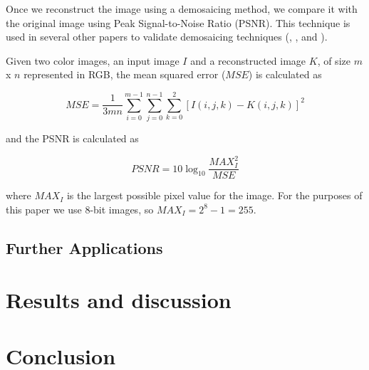 \documentclass{article}\twocolumn
\begin{document}
Once we reconstruct the image using a demosaicing method, we compare it with the original image using Peak Signal-to-Noise Ratio (PSNR). This technique is used in several other papers to validate demosaicing techniques (\cite{zapryanov_comparative_2008}, \cite{lukin_high-quality_2004}, and \cite{kimmel_demosaicing:_1999}).

Given two color images, an input image $I$ and a reconstructed image $K$, of size $m$ x $n$ represented in RGB, the mean squared error ($MSE$) is calculated as

\begin{equation}
    \textit{MSE} = \frac{1}{3mn} \sum^{m-1}_{i=0} \sum^{n-1}_{j=0} \sum^{2}_{k=0} [I(i, j, k) - K(i, j, k)]^2
\end{equation}

and the PSNR is calculated as

\begin{equation}
    \textit{PSNR} = 10 \log_{10}{\frac{\textit{MAX}^2_I}{\textit{MSE}}}
\end{equation}

where $\textit{MAX}_I$ is the largest possible pixel value for the image. For the purposes of this paper we use 8-bit images, so $\textit{MAX}_I = 2^8 - 1 = 255$.


\subsection{Further Applications}


\section{Results and discussion}


\section{Conclusion}
\end{document}
